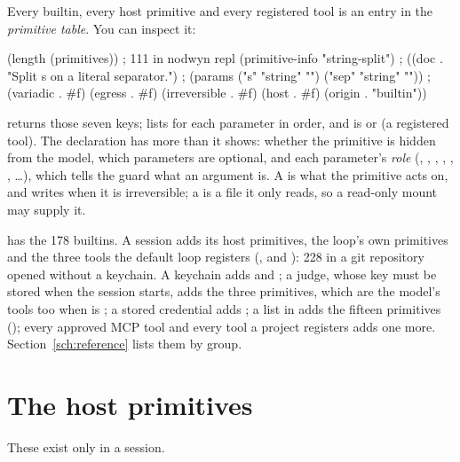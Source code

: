 Every builtin, every host primitive and every registered tool is an entry in
the \emph{primitive table}. You can inspect it:

\begin{scm}
(length (primitives))           ; 111 in nodwyn repl
(primitive-info "string-split")
; ((doc . "Split s on a literal separator.")
;  (params ("s" "string" "") ("sep" "string" ""))
;  (variadic . #f) (egress . #f) (irreversible . #f) (host . #f) (origin . "builtin"))
\end{scm}

 returns those seven keys;  lists
 for each parameter in order, and  is
 or  (a registered tool). The declaration
has more than it shows: whether the primitive is hidden from the model,
which parameters are optional, and each parameter's \emph{role}
(, , , , ,
, \ldots), which tells the guard what an argument is. A
 is what the primitive acts on, and writes when it is
irreversible; a  is a file it only reads, so a read-only
mount may supply it.

 has the 178 builtins. A session adds its host
primitives, the loop's own primitives and the three tools the default loop
registers (,  and
): 228 in a git repository opened without a keychain. A keychain adds 
and ; a judge, whose key must be stored when the
session starts, adds the three  primitives, which are the
model's tools too when  is ; a
stored  credential adds ;
a  list in  adds the fifteen
 primitives ();
every approved MCP tool and every tool a project registers adds one more. Section~\ref{sch:reference} lists them by
group.

\section{The host primitives}

These exist only in a session.

